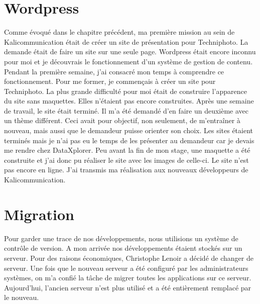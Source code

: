 
\section{Wordpress}
Comme évoqué dans le chapitre précédent, ma première mission au sein de Kalicommunication était de créer un site de présentation pour Techniphoto. La demande était de faire un site sur une seule page. Wordpress était encore inconnu pour moi et je découvrais le fonctionnement d'un système de gestion de contenu. Pendant la première semaine, j'ai consacré mon temps à comprendre ce fonctionnement. Pour me former, je commençais à créer un site pour Techniphoto. La plus grande difficulté pour moi était de construire l'apparence du site sans maquettes. Elles n'étaient pas encore construites.\newline
Après une semaine de travail, le site était terminé. Il m'a été demandé d'en faire un deuxième avec un thème différent. Ceci avait pour objectif, non seulement, de m'entraîner à nouveau, mais aussi que le demandeur puisse orienter son choix.\newline
Les sites étaient terminés mais je n'ai pas eu le temps de les présenter au demandeur car je devais me rendre chez DataXplorer.
Peu avant la fin de mon stage, une maquette a été construite et j'ai donc pu réaliser le site avec les images de celle-ci. Le site n'est pas encore en ligne. J'ai transmis ma réalisation aux nouveaux développeurs de Kalicommunication.

\section{Migration}
Pour garder une trace de nos développements, nous utilisions un système de contrôle de version. A mon arrivée nos développements étaient stockés sur un serveur. Pour des raisons économiques, Christophe Lenoir a décidé de changer de serveur. Une fois que le nouveau serveur a été configuré par les administrateurs systèmes, on m'a confié la tâche de migrer toutes les applications sur ce serveur. Aujourd'hui, l'ancien serveur n'est plus utilisé et a été entièrement remplacé par le nouveau.


